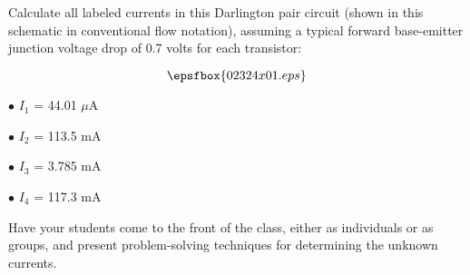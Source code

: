 

Calculate all labeled currents in this Darlington pair circuit (shown in this schematic in conventional flow notation), assuming a typical forward base-emitter junction voltage drop of 0.7 volts for each transistor:

$$\epsfbox{02324x01.eps}$$







\medskip
\goodbreak
\item{$\bullet$} $I_1$ = 44.01 $\mu$A
\item{$\bullet$} $I_2$ = 113.5 mA
\item{$\bullet$} $I_3$ = 3.785 mA
\item{$\bullet$} $I_4$ = 117.3 mA
\medskip







Have your students come to the front of the class, either as individuals or as groups, and present problem-solving techniques for determining the unknown currents.




